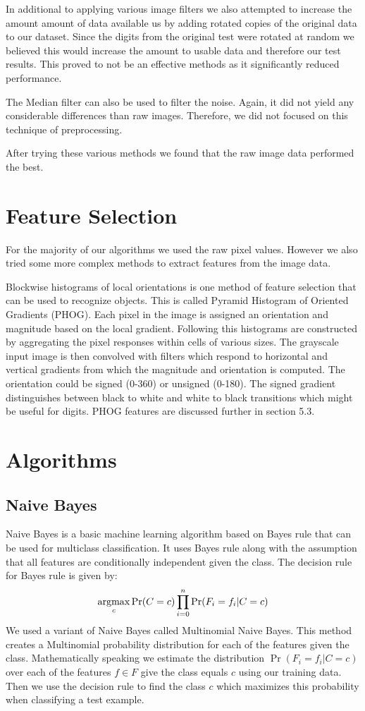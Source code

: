 \documentclass[10pt,twocolumn]{article}
\newcommand{\argmax}{\operatornamewithlimits{argmax}}
\begin{document}
In additional to applying various image filters we also attempted to increase the amount amount of data available us by adding rotated copies of the original data to our dataset. Since the digits from the original test were rotated at random we believed this would increase the amount to usable data and therefore our test results. This proved to not be an effective methods as it significantly reduced performance.

The Median filter can also be used to filter the noise. Again, it did not yield any considerable differences than raw images. Therefore, we did not focused on this technique of preprocessing.

After trying these various methods we found that the raw image data performed the best.
\section{Feature Selection}
For the majority of our algorithms we used the raw pixel values. However we also tried some  more complex methods to extract features from the image data.

Blockwise histograms of local orientations is one method of feature selection that can be used to recognize objects\cite{Maji09fastand}. This is called Pyramid Histogram of Oriented Gradients (PHOG). Each pixel in the image is assigned an orientation and magnitude based on the local gradient. Following this histograms are constructed by aggregating the pixel responses within cells of various sizes. The grayscale input image is then convolved with filters which respond to horizontal and vertical gradients from which the magnitude and orientation is computed. The orientation could be signed (0-360) or unsigned (0-180). The signed gradient distinguishes between black to white and white to black transitions which might be useful for digits. PHOG features are discussed further in  section 5.3.
\section{Algorithms}
\subsection{Naive Bayes}
Naive Bayes is a basic machine learning algorithm based on Bayes rule that can be used for multiclass classification. It uses Bayes rule along with the assumption that all features are conditionally independent given the class. The decision rule for Bayes rule is given by:
\[ \argmax_c \Pr(C = c) \prod_{i=0}^{n} \Pr(F_i = f_i | C = c)\]
We used a variant of Naive Bayes called Multinomial Naive Bayes. This method creates a Multinomial probability distribution for each of the features given the class. Mathematically speaking we estimate the distribution $\Pr(F_i = f_i | C = c)$ over each of the features $f \in F$ give the class equals $c$ using our training data. Then we use the decision rule to find the class $c$ which maximizes this probability when classifying a test example.
\end{document}
